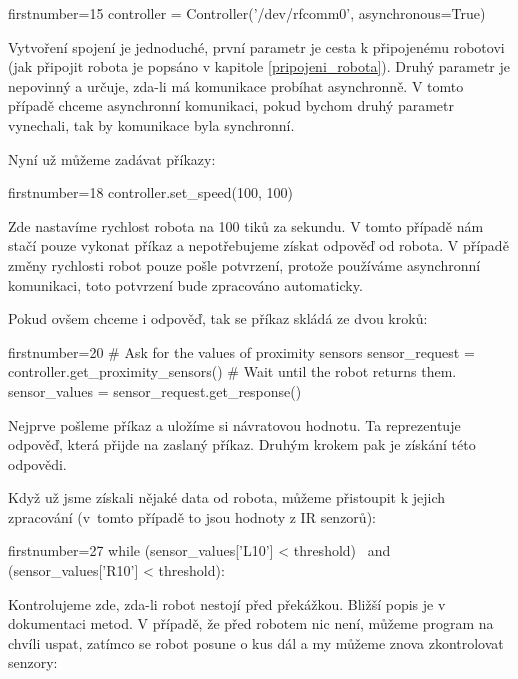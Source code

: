     \begin{pyc*}{firstnumber=15}
controller = Controller('/dev/rfcomm0', asynchronous=True)
    \end{pyc*}

    Vytvoření spojení je jednoduché, první parametr je cesta k připojenému
    robotovi (jak připojit robota je popsáno v kapitole
    \ref{pripojeni_robota}). Druhý parametr je nepovinný a určuje, zda-li má
    komunikace probíhat asynchronně. V tomto případě chceme asynchronní
    komunikaci, pokud bychom druhý parametr vynechali, tak by komunikace byla
    synchronní.

    Nyní už můžeme zadávat příkazy:

    \begin{pyc*}{firstnumber=18}
controller.set_speed(100, 100)
    \end{pyc*}

    Zde nastavíme rychlost robota na 100 tiků za sekundu. V tomto případě nám
    stačí pouze vykonat příkaz a nepotřebujeme získat odpověď od robota. V
    případě změny rychlosti robot pouze pošle potvrzení, protože používáme
    asynchronní komunikaci, toto potvrzení bude zpracováno automaticky.

    Pokud ovšem chceme i odpověď, tak se příkaz skládá ze dvou kroků:

    \begin{pyc*}{firstnumber=20}
# Ask for the values of proximity sensors
sensor_request = controller.get_proximity_sensors()
# Wait until the robot returns them.
sensor_values = sensor_request.get_response()
    \end{pyc*}

    Nejprve pošleme příkaz a uložíme si návratovou hodnotu. Ta reprezentuje
    odpověď, která přijde na zaslaný příkaz. Druhým krokem pak je získání této
    odpovědi.

    Když už jsme získali nějaké data od robota, můžeme přistoupit k jejich
    zpracování (v~tomto případě to jsou hodnoty z IR senzorů):

    \begin{pyc*}{firstnumber=27}
while (sensor_values['L10'] < threshold) \
       and (sensor_values['R10'] < threshold):
    \end{pyc*}

    Kontrolujeme zde, zda-li  robot nestojí před překážkou. Bližší popis je v
    dokumentaci metod. V případě, že před robotem nic není, můžeme program na
    chvíli uspat, zatímco se robot posune o kus dál a my můžeme znova
    zkontrolovat senzory:


